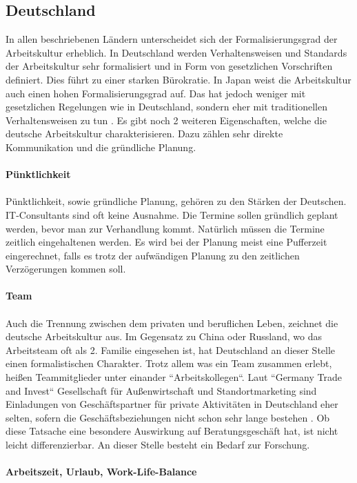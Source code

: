 	\subsection{Deutschland}
	In allen beschriebenen Ländern unterscheidet sich der Formalisierungsgrad der Arbeitskultur erheblich. In Deutschland werden Verhaltensweisen und Standards der Arbeitskultur sehr formalisiert und in Form von gesetzlichen Vorschriften definiert. Dies führt zu einer starken Bürokratie. In Japan weist die Arbeitskultur auch einen hohen Formalisierungsgrad auf. Das hat jedoch weniger mit gesetzlichen Regelungen wie in Deutschland, sondern eher mit traditionellen Verhaltensweisen zu tun \cite[236]{3LaenderVergl}. Es gibt noch 2 weiteren Eigenschaften, welche die deutsche Arbeitskultur charakterisieren. Dazu zählen sehr direkte Kommunikation und die gründliche Planung.\\ \\
	\textbf{Pünktlichkeit}\\ \\
	Pünktlichkeit, sowie gründliche Planung, gehören zu den Stärken der Deutschen. IT-Consultants sind oft keine Ausnahme. Die Termine sollen gründlich geplant werden, bevor man zur Verhandlung kommt. Natürlich müssen die Termine zeitlich eingehaltenen werden. Es wird bei der Planung meist eine Pufferzeit eingerechnet, falls es trotz der aufwändigen Planung zu den zeitlichen Verzögerungen kommen soll.\\ \\
	\textbf{Team} \\ \\
		Auch die  Trennung zwischen dem privaten und beruflichen Leben, zeichnet die  deutsche Arbeitskultur aus. Im Gegensatz zu China oder Russland, wo das Arbeitsteam oft als 2. Familie eingesehen ist, hat Deutschland an dieser Stelle einen formalistischen Charakter. Trotz allem was ein Team zusammen erlebt, heißen Teammitglieder unter einander ``Arbeitskollegen``. Laut ``Germany Trade and Invest``
		Gesellschaft für Außenwirtschaft und Standortmarketing sind Einladungen  von Geschäftspartner für private Aktivitäten in Deutschland eher selten, sofern die  Geschäftsbeziehungen nicht schon sehr lange bestehen \cite{ArbKulturDE}. Ob diese Tatsache eine besondere Auswirkung auf Beratungsgeschäft hat, ist nicht leicht differenzierbar. An dieser Stelle besteht ein Bedarf zur Forschung. \\ \\
	\textbf{Arbeitszeit, Urlaub, Work-Life-Balance } \\ \\
